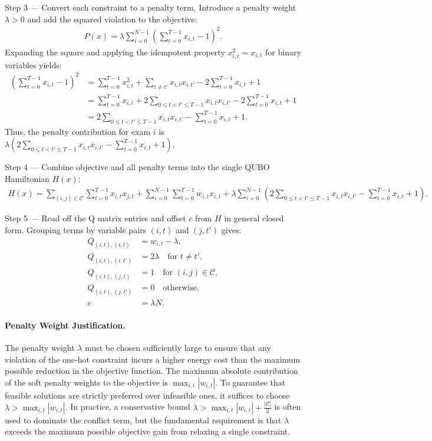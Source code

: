 \documentclass[12pt]{article}
\begin{document}
Step 3 --- Convert each constraint to a penalty term. Introduce a penalty weight $\lambda > 0$ and add the squared violation to the objective:
\begin{align}
P(x) = \lambda \sum_{i=0}^{N-1} \left( \sum_{t=0}^{T-1} x_{i,t} - 1 \right)^2.
\end{align}
Expanding the square and applying the idempotent property $x_{i,t}^2 = x_{i,t}$ for binary variables yields:
\begin{align}
\left( \sum_{t=0}^{T-1} x_{i,t} - 1 \right)^2 &= \sum_{t=0}^{T-1} x_{i,t}^2 + \sum_{t \neq t'} x_{i,t} x_{i,t'} - 2 \sum_{t=0}^{T-1} x_{i,t} + 1 \\
&= \sum_{t=0}^{T-1} x_{i,t} + 2 \sum_{0 \le t < t' \le T-1} x_{i,t} x_{i,t'} - 2 \sum_{t=0}^{T-1} x_{i,t} + 1 \\
&= 2 \sum_{0 \le t < t' \le T-1} x_{i,t} x_{i,t'} - \sum_{t=0}^{T-1} x_{i,t} + 1.
\end{align}
Thus, the penalty contribution for exam $i$ is $\lambda \left( 2 \sum_{0 \le t < t' \le T-1} x_{i,t} x_{i,t'} - \sum_{t=0}^{T-1} x_{i,t} + 1 \right)$.

Step 4 --- Combine objective and all penalty terms into the single QUBO Hamiltonian $H(x)$:
\begin{align}
H(x) = \sum_{(i,j) \in \mathcal{C}} \sum_{t=0}^{T-1} x_{i,t} x_{j,t} + \sum_{i=0}^{N-1} \sum_{t=0}^{T-1} w_{i,t} x_{i,t} + \lambda \sum_{i=0}^{N-1} \left( 2 \sum_{0 \le t < t' \le T-1} x_{i,t} x_{i,t'} - \sum_{t=0}^{T-1} x_{i,t} + 1 \right).
\end{align}

Step 5 --- Read off the Q matrix entries and offset $c$ from $H$ in general closed form. Grouping terms by variable pairs $(i,t)$ and $(j,t')$ gives:
\begin{align}
Q_{(i,t),(i,t)} &= w_{i,t} - \lambda, \\
Q_{(i,t),(i,t')} &= 2\lambda \quad \text{for } t \neq t', \\
Q_{(i,t),(j,t)} &= 1 \quad \text{for } (i,j) \in \mathcal{C}, \\
Q_{(i,t),(j,t')} &= 0 \quad \text{otherwise}, \\
c &= \lambda N.
\end{align}

\paragraph{Penalty Weight Justification.}
The penalty weight $\lambda$ must be chosen sufficiently large to ensure that any violation of the one-hot constraint incurs a higher energy cost than the maximum possible reduction in the objective function. The maximum absolute contribution of the soft penalty weights to the objective is $\max_{i,t} |w_{i,t}|$. To guarantee that feasible solutions are strictly preferred over infeasible ones, it suffices to choose $\lambda > \max_{i,t} |w_{i,t}|$. In practice, a conservative bound $\lambda > \max_{i,t} |w_{i,t}| + \frac{|\mathcal{C}|}{2}$ is often used to dominate the conflict term, but the fundamental requirement is that $\lambda$ exceeds the maximum possible objective gain from relaxing a single constraint.
\end{document}
